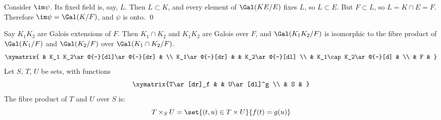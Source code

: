 Consider $\im\psi$.  Its fixed field is, say, $L$.  Then $L\subset K$, and every element of $\Gal(KE/E)$ fixes $L$, so $L\subset E$.  But $F\subset L$, so $L=K\cap E=F$.  Therefore $\im\psi=\Gal(K/F)$, and $\psi$ is onto. \qed

\thm Say $K_1K_2$ are Galois extensions of $F$.  Then $K_1\cap K_2$ and $K_1K_2$ are Galois over $F$, and $\Gal(K_1K_2/F)$ is isomorphic to the fibre product of $\Gal(K_1/F)$ and $\Gal(K_2/F)$ over $\Gal(K_1\cap K_2/F)$.
\[ \xymatrix{
& K_1 K_2\ar@{-}[dl]\ar@{-}[dr] & \\
K_1\ar@{-}[dr] & & K_2\ar@{-}[dl] \\
& K_1\cap K_2\ar@{-}[d] & \\
& F &
} \]
 Let $S$, $T$, $U$ be sets, with functions
\[ \xymatrix{T\ar[dr]_f & & U\ar[dl]^g \\ & S & } \]
The fibre product of $T$ and $U$ over $S$ is:
\[ T \times_S U = \set{(t,u)\in T\times U}{f(t)=g(u)} \]

